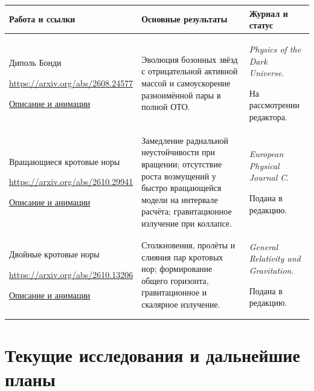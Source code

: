 \documentclass[11pt,a4paper]{article}
\begin{document}
{\small
\def\UrlBreaks{\do\/}
\noindent
\begin{tabularx}{\textwidth}{@{}L{36mm}YL{34mm}@{}}
\toprule
\textbf{Работа и ссылки} & \textbf{Основные результаты} & \textbf{Журнал и статус} \\
\midrule
Диполь Бонди\par
\url{https://arxiv.org/abs/2608.24577}\par
\href{https://www.firstinterstellarinstitute.com/research/bondi-dipole/}{Описание и анимации}
& Эволюция бозонных звёзд с отрицательной активной массой и самоускорение разноимённой пары в полной ОТО.
& \textit{Physics of the Dark Universe}.\par На рассмотрении редактора. \\
\midrule
Вращающиеся кротовые норы\par
\url{https://arxiv.org/abs/2610.29941}\par
\href{https://www.firstinterstellarinstitute.com/research/spinning-wormholes/}{Описание и анимации}
& Замедление радиальной неустойчивости при вращении; отсутствие роста возмущений у быстро вращающейся модели на интервале расчёта; гравитационное излучение при коллапсе.
& \textit{European Physical Journal C}.\par Подана в редакцию. \\
\midrule
Двойные кротовые норы\par
\url{https://arxiv.org/abs/2610.13206}\par
\href{https://www.firstinterstellarinstitute.com/research/binary-wormholes/}{Описание и анимации}
& Столкновения, пролёты и слияния пар кротовых нор; формирование общего горизонта, гравитационное и скалярное излучение.
& \textit{General Relativity and Gravitation}.\par Подана в редакцию. \\
\bottomrule
\end{tabularx}
\par
}

\newpage
\section*{Текущие исследования и дальнейшие планы}
\end{document}
